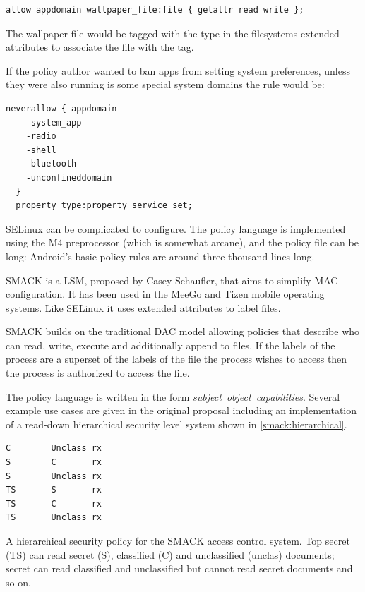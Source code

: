 \documentclass[a4paper,sfsidenotes]{%
  article%
}
\begin{document}
\begin{lstlisting}[language=selinux]
allow appdomain wallpaper_file:file { getattr read write };
\end{lstlisting}

The wallpaper file would be tagged with the  type in the
filesystems extended attributes to associate the file with the tag.

If the policy author wanted to ban apps from setting system preferences, unless
they were also running is some special system domains the rule would be:

\begin{lstlisting}[language=selinux]
neverallow { appdomain 
    -system_app 
    -radio 
    -shell 
    -bluetooth 
    -unconfineddomain
  }
  property_type:property_service set;
\end{lstlisting}

SELinux can be complicated to configure.  The policy language is implemented
using the M4 preprocessor (which is somewhat arcane), and the policy file can be
long: Android's basic policy rules are around three thousand lines long.

SMACK is a \ac{LSM}, proposed by Casey Schaufler\cite{Shaufler:_OMTJQq8}, that
aims to simplify \ac{MAC} configuration.  It has been used in the MeeGo and
Tizen mobile operating systems.  Like SELinux it uses extended attributes to
label files.

SMACK builds on the traditional \ac{DAC} model allowing policies that describe
who can read, write, execute and additionally append to files.  If the labels of
the process are a superset of the labels of the file the process wishes to
access then the process is authorized to access the file.

The policy language is written in the form \emph{subject~object~capabilities}.
Several example use cases are given in the original proposal including an
implementation of a read-down hierarchical security level system shown in
\autoref{smack:hierarchical}.

\begin{marginfigure}
  \begin{lstlisting}
C        Unclass rx
S        C       rx
S        Unclass rx
TS       S       rx
TS       C       rx
TS       Unclass rx
  \end{lstlisting}
  \caption{A hierarchical security policy for the SMACK access control system.
    Top secret (TS) can read secret (S), classified (C) and unclassified
    (unclas) documents; secret can read classified and unclassified but cannot
  read secret documents and so on.}
  \label{smack:hierarchical}
\end{marginfigure}
\end{document}
